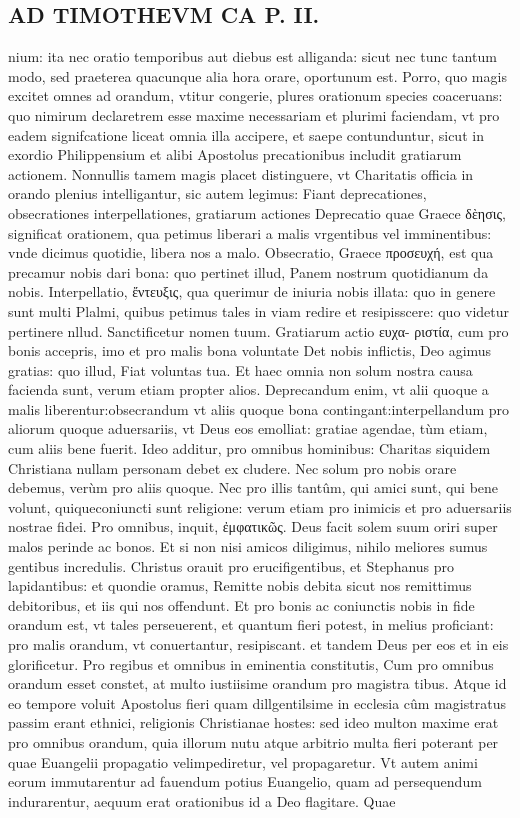 \documentclass{article}
\begin{document}
\begin{pages}
\section*{AD TIMOTHEVM CA P. II. }
\marginpar{[ p.55 ]}\pstart nium: ita nec oratio temporibus aut diebus  est alliganda: sicut nec tunc tantum modo, sed praeterea quacunque alia hora orare, oportunum est. Porro, quo magis excitet omnes ad orandum, vtitur congerie, plures orationum species coaceruans: quo nimirum declaretrem esse maxime necessariam et plurimi faciendam, vt pro eadem signifcatione liceat omnia illa accipere, et saepe contunduntur, sicut in exordio Philippensium et alibi Apostolus precationibus includit gratiarum actionem. Nonnullis tamem magis placet distinguere, vt Charitatis officia in orando plenius intelligantur, sic autem legimus: Fiant deprecationes, obsecrationes interpellationes, gratiarum actiones Deprecatio quae Graece δὲησις, significat orationem, qua petimus liberari a malis vrgentibus vel imminentibus: vnde dicimus quotidie, libera nos a malo. Obsecratio, Graece προσευχή, est qua precamur nobis dari bona: quo pertinet illud, Panem nostrum quotidianum da nobis. Interpellatio, ἔντευξις, qua querimur de iniuria nobis illata: quo in genere sunt multi Plalmi, quibus petimus tales in viam redire et resipisscere: quo videtur pertinere nllud. Sanctificetur nomen tuum. Gratiarum actio ευχα- ριστία, cum pro bonis accepris, imo et pro malis bona voluntate Det nobis inflictis, Deo agimus gratias: quo illud, Fiat voluntas tua. Et haec omnia non solum nostra causa facienda sunt, verum etiam propter alios. Deprecandum enim, vt alii quoque a malis liberentur:obsecrandum vt aliis quoque bona contingant:interpellandum pro aliorum quoque aduersariis, vt Deus eos emolliat: gratiae agendae, tùm etiam, cum aliis bene fuerit. Ideo additur, pro omnibus hominibus: Charitas siquidem Christiana nullam personam debet ex cludere. Nec solum pro nobis orare debemus, verùm pro aliis quoque. Nec pro illis tantûm, qui amici sunt, qui bene volunt, quiqueconiuncti sunt religione: verum etiam pro inimicis et pro aduersariis nostrae fidei. Pro omnibus, inquit, ἐμφατικῶς. Deus facit solem suum oriri super malos perinde ac bonos. Et si non nisi amicos diligimus, nihilo meliores sumus gentibus incredulis. Christus orauit pro erucifigentibus, et Stephanus pro lapidantibus: et quondie oramus, Remitte nobis debita sicut nos remittimus debitoribus, et iis qui nos offendunt. Et pro bonis ac coniunctis nobis in fide orandum est, vt tales perseuerent, et quantum fieri potest, in melius proficiant: pro malis orandum, vt conuertantur, resipiscant. et tandem Deus per eos et in eis glorificetur. Pro regibus et omnibus in eminentia constitutis, Cum pro omnibus orandum esset constet, at multo iustiisime orandum pro magistra tibus. Atque id eo tempore voluit Apostolus fieri quam dillgentilsime in ecclesia cûm magistratus passim erant ethnici, religionis Christianae hostes: sed ideo multon maxime erat pro omnibus orandum, quia illorum nutu atque arbitrio multa fieri poterant per quae Euangelii propagatio velimpediretur, vel propagaretur. Vt autem animi eorum immutarentur ad fauendum potius Euangelio, quam ad persequendum indurarentur, aequum erat orationibus id a Deo flagitare. Quae 
\end{pages}
\end{document}

